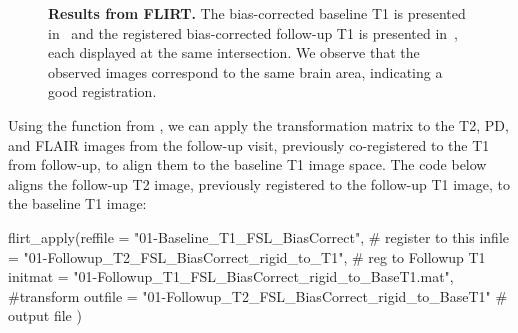 \begin{figure}
\hfill
\caption[{\bf Results from FLIRT.}]{{\bf Results from FLIRT.} The bias-corrected baseline T1 is presented in~\protect{} and the registered bias-corrected follow-up T1 is presented in~\protect{}, each displayed at the same intersection. We observe that the observed images correspond to the same brain area, indicating a good registration. }
\label{fig:flirt}
\end{figure}


Using the  function from , we can apply the transformation matrix to the T2, PD, and FLAIR images from the follow-up visit, previously co-registered to the T1 from follow-up, to align them to the baseline T1 image space.  The code below aligns the follow-up T2 image, previously registered to the follow-up T1 image, to the baseline T1 image:

\newpage	
\begin{Schunk}
\begin{Sinput}
flirt_apply(reffile = "01-Baseline_T1_FSL_BiasCorrect", 
		# register to this
            infile = "01-Followup_T2_FSL_BiasCorrect_rigid_to_T1", 
            	# reg to Followup T1
            initmat = "01-Followup_T1_FSL_BiasCorrect_rigid_to_BaseT1.mat", 
            	#transform
            outfile = "01-Followup_T2_FSL_BiasCorrect_rigid_to_BaseT1" 
            	# output file
            ) 
\end{Sinput}
\end{Schunk}



